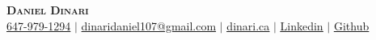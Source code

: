 \begin{center}
    \textbf{\Huge \scshape Daniel Dinari} \\ \vspace{1pt}
    \small \href{tel:6479791294}{647-979-1294} $|$ 
    \href{mailto:dinaridaniel107@gmail.com}{dinaridaniel107@gmail.com} $|$ 
    \href{https://dinari.ca/}{\underline{dinari.ca}} $|$
    \href{https://www.linkedin.com/in/daniel-dinari/}{\underline{Linkedin}} $|$
    \href{https://github.com/doxxedd}{\underline{Github}}
\end{center}